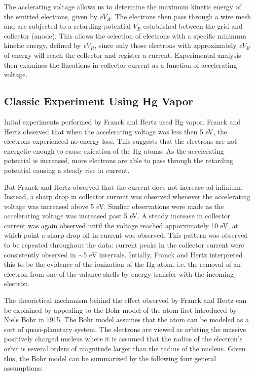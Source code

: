 \documentclass[aps,twocolumn,secnumarabic,balancelastpage,amsmath,amssymb,nofootinbib]{revtex4}
\begin{document}
The acclerating voltage allows us to determine the maximum kinetic energy of the emitted electrons, given by \emph{e$V_{A}$}.  The electrons then pass through a wire mesh and are subjected 
to a retarding potential $V_{R}$ established between the grid and collector (anode).  This allows the selection of electrons with a specific minimum kinetic energy, defined by \emph{e$V_{R}$}, 
since only those electrons with approximately \emph{e$V_{R}$} of energy will reach the collector and register a current.  Experimental analysis then examines the flucations in collector 
current as a function of accelerating voltage.  

\subsection{Classic Experiment Using Hg Vapor}

Inital experiments performed by Franck and Hertz used Hg vapor.  Franck and Hertz observed that when the accelerating voltage was less then 5 eV, the electrons experienced no energy loss. This suggests 
that the electrons are not energetic enough to cause exication of the Hg atoms.  As the accelerating potential is increased, more electrons are able to pass through the retarding potential causing a
steady rise in current.  

But Franck and Hertz observed that the current does not increase ad infinium.  Instead, a sharp drop in collector current was observed whenever the accelerating voltage was increased above 5 eV.  
Simliar observations were made as the accelerating voltage was increased past 5 eV.  A steady increase in collector current was again observed until the voltage reached apporximately 10 eV, at 
which point a sharp drop off in current was observed.  This pattern was observed to be repeated throughout the data: current peaks in the collector current were consistently observed in $\sim$5 eV 
intervals.  Intially, Franck and Hertz interpreted this to be the evidence of the ionization of the Hg atom, i.e. the removal of an electron from one of the valance shells by energy transfer with
the incoming electron.

The theorietical mechanism behind the effect observed by Franck and Hertz can be explained by appealing to the Bohr model of the atom first introduced by Niels Bohr in 1915.  The Bohr model assumes
that the atom can be modeled as a sort of quasi-planetary system.  The electrons are viewed as orbiting the massive positively charged nucleus where it is assumed that the radius of the electron's
orbit is several orders of magnitude larger than the radius of the nucleus.  Given this, the Bohr model can be summarized by the following four general assumptions:
\end{document}
